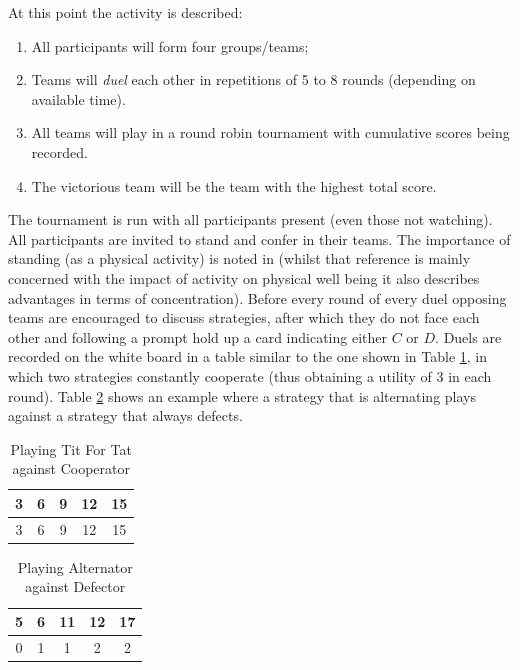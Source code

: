 \documentclass{article}
\begin{document}
At this point the activity is described:

\begin{enumerate}
    \item All participants will form four groups/teams;
    \item Teams will \textit{duel} each other in repetitions of 5 to 8 rounds
        (depending on available time).
    \item All teams will play in a round robin tournament with cumulative scores
        being recorded.
    \item The victorious team will be the team with the highest total score.
\end{enumerate}

The tournament is run with all participants present (even those not watching).
All participants are invited to stand and confer in their teams. The importance
of standing (as a physical activity) is noted in \cite{Donnelly2011} (whilst
that reference is mainly concerned with the impact of activity on physical well
being it also describes advantages in terms of concentration).  Before every
round of every duel opposing teams are encouraged to discuss strategies, after
which they do not face each other and following a prompt hold up a card
indicating either \(C\) or \(D\).  Duels are recorded on the white board in a
table similar to the one shown in Table \ref{tab:duel}, in which two strategies
constantly cooperate (thus obtaining a utility of 3 in each round). Table
\ref{tab:duel_1} shows an example where a strategy that is alternating plays
against a strategy that always defects.

\begin{table}[!htbp]
    \caption{Playing Tit For Tat against Cooperator}
    \centering
    \begin{tabular}{ccccc}
        \toprule
        3&6&9&12&15\\
        \midrule
        3&6&9&12&15\\
        \bottomrule
    \end{tabular}
    \label{tab:duel}
\end{table}

\begin{table}[!htbp]
    \caption{Playing Alternator against Defector}
    \centering
    \begin{tabular}{ccccc}
        \toprule
        5&6&11&12&17\\
        \midrule
        0&1&1&2&2\\
        \bottomrule
    \end{tabular}
    \label{tab:duel_1}
\end{table}
\end{document}
